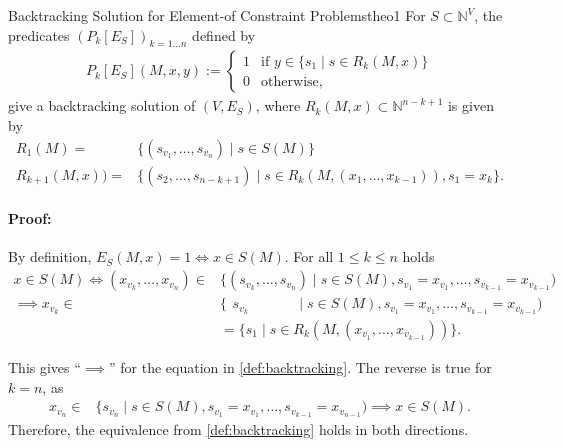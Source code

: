 \begin{theorem}{Backtracking Solution for Element-of Constraint Problems}{theo1}
    For $S\subset\mathbb N^V$, the predicates $(P_k[E_S])_{k=1\dots n}$
    defined by
    \begin{align*}
        P_k[E_S](M,x,y):=\left\{
            \begin{array}{ll}
                1&\text{if }y\in \{s_1\mid s\in R_k(M,x)\}\\
                0&\text{otherwise},
            \end{array}\right.
    \end{align*}
    give a backtracking solution of $(V,E_S)$, where
    $R_k(M,x)\subset\mathbb N^{n-k+1}$ is given by
    \begin{align*}
        R_1(M)={}&\{(s_{v_1},\dots,s_{v_n})\mid s\in S(M)\}\\
        R_{k+1}(M,x))={}&\{(s_2,\dots,s_{n-k+1})\mid s\in R_k(M,(x_1,\dots,x_{k-1})), s_1=x_k\}.
    \end{align*}
    \tcblower
    \paragraph*{Proof:} By definition, $E_S(M,x)=1\iff x\in S(M)$.
    For all $1\leq k\leq n$ holds
    \begin{align*}
        x\in S(M)\iff(x_{v_k},\dots,x_{v_n})\in{}&\{(s_{v_k},\dots,s_{v_n})\mid s\in S(M),s_{v_1}=x_{v_1},\dots,s_{v_{k-1}}=x_{v_{k-1}})\\
                            \implies x_{v_k}\in{}&\{\phantom{(}s_{v_k}\phantom{,\dots,s_{v_n})}\mid s\in S(M),s_{v_1}=x_{v_1},\dots,s_{v_{k-1}}=x_{v_{k-1}})\\
                                                 &=\{s_1\mid s\in R_k(M,(x_{v_1},\dots,x_{v_{k-1}}))\}.
    \end{align*}

    This gives ``$\implies$'' for the equation in \autoref{def:backtracking}.
    The reverse is true for $k=n$, as
    \begin{align*}
        x_{v_n}\in{}&\{s_{v_n}\mid s\in S(M),s_{v_1}=x_{v_1},\dots,s_{v_{k-1}}=x_{v_{n-1}})\implies x\in S(M).
    \end{align*}
    Therefore, the equivalence from \autoref{def:backtracking} holds in both directions.
\end{theorem}
